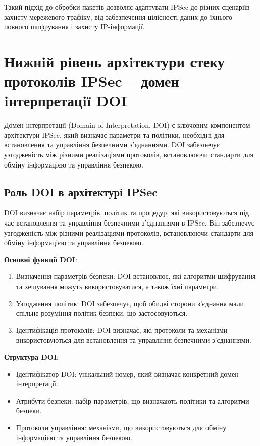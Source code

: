 Такий підхід до обробки пакетів дозволяє адаптувати IPSec до різних сценаріїв захисту мережевого трафіку, від забезпечення цілісності даних до їхнього повного шифрування і захисту IP-інформації.

\section{Нижнiй рiвень архiтектури стеку протоколiв IPSec
– домен iнтерпретацiї DOI}

Домен інтерпретації (Domain of Interpretation, DOI) є ключовим компонентом архітектури IPSec, який визначає параметри та політики, необхідні для встановлення та управління безпечними з'єднаннями. DOI забезпечує узгодженість між різними реалізаціями протоколів, встановлюючи стандарти для обміну інформацією та управління безпекою.

\subsection{Роль DOI в архітектурі IPSec}

DOI визначає набір параметрів, політик та процедур, які використовуються під час встановлення та управління безпечними з'єднаннями в IPSec. Він забезпечує узгодженість між різними реалізаціями протоколів, встановлюючи стандарти для обміну інформацією та управління безпекою.

\textbf{Основні функції DOI}:
\begin{enumerate}
    \item Визначення параметрів безпеки: DOI встановлює, які алгоритми шифрування та хешування можуть використовуватися, а також їхні параметри.
    \item Узгодження політик: DOI забезпечує, щоб обидві сторони з'єднання мали спільне розуміння політик безпеки, що застосовуються.
    \item Ідентифікація протоколів: DOI визначає, які протоколи та механізми використовуються для встановлення та управління безпечними з'єднаннями.
\end{enumerate}

\textbf{Структура DOI}:
\begin{itemize}
    \item Ідентифікатор DOI: унікальний номер, який визначає конкретний домен інтерпретації.
    \item Атрибути безпеки: набір параметрів, що визначають політики та алгоритми безпеки.
    \item Протоколи управління: механізми, що використовуються для обміну інформацією та управління безпекою.
\end{itemize}

